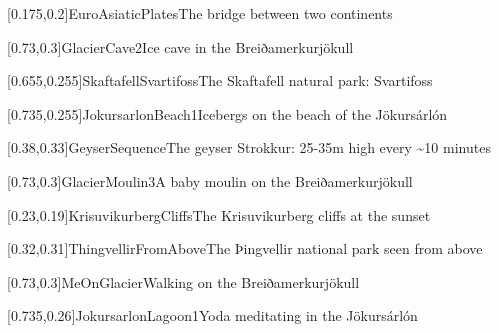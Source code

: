 



\graphicspath{{Figures/}{Figures/Iceland/}}


\subtitle{Day 2}
\date{23 June 2026}


    
    [0.175,0.2]{EuroAsiaticPlates}{The bridge between two continents}
    
    [0.73,0.3]{GlacierCave2}{Ice cave in the Breiðamerkurj\"okull}
    
    [0.655,0.255]{SkaftafellSvartifoss}{The Skaftafell natural park: Svartifoss}
    
    
    [0.735,0.255]{JokursarlonBeach1}{Icebergs on the beach of the J\"okurs\'arl\'on}
    
    [0.38,0.33]{GeyserSequence}{The geyser Strokkur: 25-35m high every \textasciitilde10 minutes}
    
    
    [0.73,0.3]{GlacierMoulin3}{A baby moulin on the Breiðamerkurj\"okull}
    
    [0.23,0.19]{KrisuvikurbergCliffs}{The Krisuvikurberg cliffs at the sunset}
    
    
    [0.32,0.31]{ThingvellirFromAbove}{The Þingvellir national park seen from above}
    
    [0.73,0.3]{MeOnGlacier}{Walking on the Breiðamerkurj\"okull}
    
    [0.735,0.26]{JokursarlonLagoon1}{Yoda meditating in the J\"okurs\'arl\'on}
    

